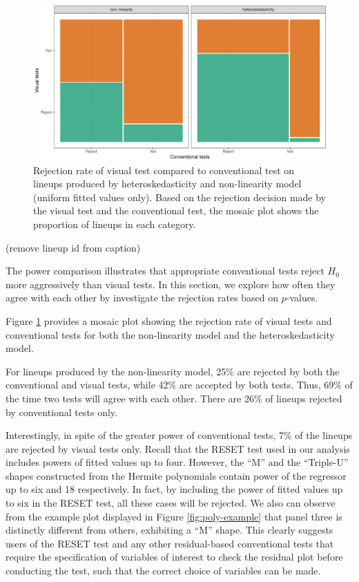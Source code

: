 \documentclass[]{interact}
\theoremstyle{plain}%
\theoremstyle{definition}
\theoremstyle{remark}
\begin{document}
\begin{figure}

{\centering \includegraphics[width=1\linewidth]{paper_comparison_files/figure-latex/p-value-comparison-1} 

}

\caption{Rejection rate of visual test compared to conventional test on lineups produced by heteroskedasticity and non-linearity model (uniform fitted values only). Based on the rejection decision made by the visual test and the conventional test, the mosaic plot shows the proportion of lineups in each category.}\label{fig:p-value-comparison}
\end{figure}

(remove lineup id from caption)

The power comparison illustrates that appropriate conventional tests
reject \(H_0\) more aggressively than visual tests. In this section, we
explore how often they agree with each other by investigate the
rejection rates based on \(p\)-values.

Figure \ref{fig:p-value-comparison} provides a mosaic plot showing the
rejection rate of visual tests and conventional tests for both the
non-linearity model and the heteroskedasticity model.

For lineups produced by the non-linearity model, 25\% are rejected by
both the conventional and visual tests, while 42\% are accepted by both
tests. Thus, 69\% of the time two tests will agree with each other.
There are 26\% of lineups rejected by conventional tests only.

Interestingly, in spite of the greater power of conventional tests, 7\%
of the lineups are rejected by visual tests only. Recall that the RESET
test used in our analysis includes powers of fitted values up to four.
However, the ``M'' and the ``Triple-U'' shapes constructed from the
Hermite polynomials contain power of the regressor up to six and 18
respectively. In fact, by including the power of fitted values up to six
in the RESET test, all these cases will be rejected. We also can observe
from the example plot displayed in Figure \ref{fig:poly-example} that
panel three is distinctly different from others, exhibiting a ``M''
shape. This clearly suggests users of the RESET test and any other
residual-based conventional tests that require the specification of
variables of interest to check the residual plot before conducting the
test, such that the correct choice of variables can be made.
\end{document}
